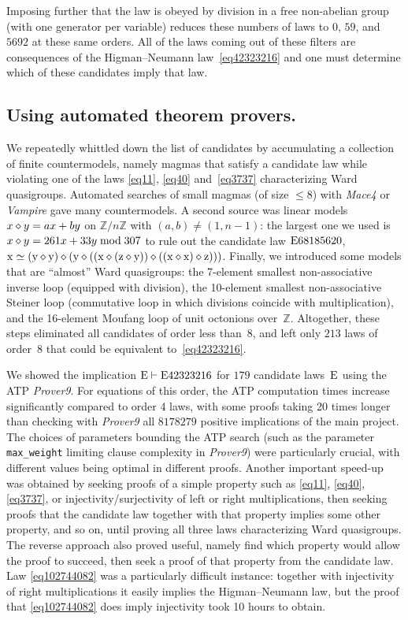 Imposing further that the law is obeyed by division in a free non-abelian group (with one generator per variable) reduces these numbers of laws to $0$, $59$, and $\num{5692}$ at these same orders.  All of the laws coming out of these filters are consequences of the Higman--Neumann law~\eqref{eq42323216} and one must determine which of these candidates imply that law.

\subsection{Using automated theorem provers.}

We repeatedly whittled down the list of candidates by accumulating a collection of finite countermodels, namely magmas that satisfy a candidate law while violating one of the laws \eqref{eq11}, \eqref{eq40} and~\eqref{eq3737} characterizing Ward quasigroups.  Automated searches of small magmas (of size $\leq 8$) with \emph{Mace4} or \emph{Vampire} gave many countermodels.  A second source was linear models $x \diamond y = ax+by$ on $\mathbb{Z}/n\mathbb{Z}$ with $(a,b)\neq(1,n-1)$: the largest one we used is $x \diamond y = 261x + 33y \bmod 307$ to rule out the candidate law $\mathrm{E}68185620$, $\mathrm{x} \simeq (\mathrm{y} \diamond \mathrm{y}) \diamond (\mathrm{y} \diamond ((\mathrm{x} \diamond (\mathrm{z} \diamond \mathrm{y})) \diamond ((\mathrm{x} \diamond \mathrm{x}) \diamond \mathrm{z})))$.  Finally, we introduced some models that are ``almost'' Ward quasigroups: the 7-element smallest non-associative inverse loop (equipped with division), the 10-element smallest non-associative Steiner loop (commutative loop in which divisions coincide with multiplication), and the 16-element Moufang loop of unit octonions over~$\mathbb{Z}$.  Altogether, these steps eliminated all candidates of order less than~$8$, and left only $213$ laws of order~$8$ that could be equivalent to~\eqref{eq42323216}.

We showed the implication $\mathrm{E}\vdash\mathrm{E}42323216$ for $179$ candidate laws~$\mathrm{E}$ using the ATP \emph{Prover9}.  For equations of this order, the ATP computation times increase significantly compared to order 4 laws, with some proofs taking 20 times longer than checking with \emph{Prover9} all $\num{8178279}$ positive implications of the main project.  The choices of parameters bounding the ATP search (such as the parameter \texttt{max\_weight} limiting clause complexity in \emph{Prover9}) were particularly crucial, with different values being optimal in different proofs.  Another important speed-up was obtained by seeking proofs of a simple property such as \eqref{eq11}, \eqref{eq40}, \eqref{eq3737}, or injectivity/surjectivity of left or right multiplications, then seeking proofs that the candidate law together with that property implies some other property, and so on, until proving all three laws characterizing Ward quasigroups.  The reverse approach also proved useful, namely find which property would allow the proof to succeed, then seek a proof of that property from the candidate law.  Law \eqref{eq102744082} was a particularly difficult instance: together with injectivity of right multiplications it easily implies the Higman--Neumann law, but the proof that \eqref{eq102744082} does imply injectivity took 10 hours to obtain.

